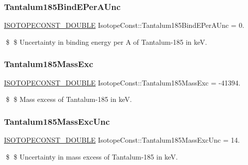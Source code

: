 \subsubsection{\texorpdfstring{Tantalum185\+Bind\+E\+Per\+A\+Unc}{Tantalum185BindEPerAUnc}}
{\footnotesize\ttfamily \mbox{\hyperlink{group___isotope_const-_macros_ga8f45a7272ce02c0b4c65c44636ed719a}{I\+S\+O\+T\+O\+P\+E\+C\+O\+N\+S\+T\+\_\+\+D\+O\+U\+B\+LE}} Isotope\+Const\+::\+Tantalum185\+Bind\+E\+Per\+A\+Unc = 0.}

\$ \$ Uncertainty in binding energy per A of Tantalum-\/185 in keV. \mbox{\label{group___isotope_const-_tantalum-_ta185_ga1337216e57ffd22a7817e6745d81c173}} 
\subsubsection{\texorpdfstring{Tantalum185\+Mass\+Exc}{Tantalum185MassExc}}
{\footnotesize\ttfamily \mbox{\hyperlink{group___isotope_const-_macros_ga8f45a7272ce02c0b4c65c44636ed719a}{I\+S\+O\+T\+O\+P\+E\+C\+O\+N\+S\+T\+\_\+\+D\+O\+U\+B\+LE}} Isotope\+Const\+::\+Tantalum185\+Mass\+Exc = -\/41394.}

\$ \$ Mass excess of Tantalum-\/185 in keV. \mbox{\label{group___isotope_const-_tantalum-_ta185_gad09625c20de3e281a7e0c7ee24ed44ca}} 
\subsubsection{\texorpdfstring{Tantalum185\+Mass\+Exc\+Unc}{Tantalum185MassExcUnc}}
{\footnotesize\ttfamily \mbox{\hyperlink{group___isotope_const-_macros_ga8f45a7272ce02c0b4c65c44636ed719a}{I\+S\+O\+T\+O\+P\+E\+C\+O\+N\+S\+T\+\_\+\+D\+O\+U\+B\+LE}} Isotope\+Const\+::\+Tantalum185\+Mass\+Exc\+Unc = 14.}

\$ \$ Uncertainty in mass excess of Tantalum-\/185 in keV. \mbox{\label{group___isotope_const-_tantalum-_ta185_gac3d8213c2361ecfe694f21d858fb4d90}} 
